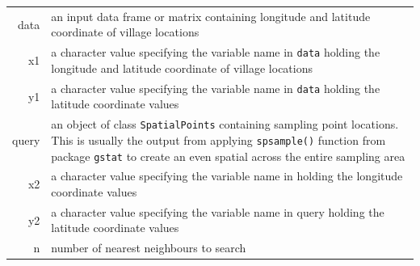 \documentclass[11pt,a4paper]{article}
\begin{document}
\begin{longtable}[]{@{}rl@{}}
\toprule
\begin{minipage}[t]{0.10\columnwidth}\raggedleft
data\strut
\end{minipage} & \begin{minipage}[t]{0.82\columnwidth}\raggedright
an input data frame or matrix containing longitude and latitude
coordinate of village locations\strut
\end{minipage}\tabularnewline
\begin{minipage}[t]{0.10\columnwidth}\raggedleft
x1\strut
\end{minipage} & \begin{minipage}[t]{0.82\columnwidth}\raggedright
a character value specifying the variable name in \texttt{data} holding
the longitude and latitude coordinate of village locations\strut
\end{minipage}\tabularnewline
\begin{minipage}[t]{0.10\columnwidth}\raggedleft
y1\strut
\end{minipage} & \begin{minipage}[t]{0.82\columnwidth}\raggedright
a character value specifying the variable name in \texttt{data} holding
the latitude coordinate values\strut
\end{minipage}\tabularnewline
\begin{minipage}[t]{0.10\columnwidth}\raggedleft
query\strut
\end{minipage} & \begin{minipage}[t]{0.82\columnwidth}\raggedright
an object of class \texttt{SpatialPoints} containing sampling point
locations. This is usually the output from applying \texttt{spsample()}
function from package \texttt{gstat} to create an even spatial across
the entire sampling area\strut
\end{minipage}\tabularnewline
\begin{minipage}[t]{0.10\columnwidth}\raggedleft
x2\strut
\end{minipage} & \begin{minipage}[t]{0.82\columnwidth}\raggedright
a character value specifying the variable name in holding the longitude
coordinate values\strut
\end{minipage}\tabularnewline
\begin{minipage}[t]{0.10\columnwidth}\raggedleft
y2\strut
\end{minipage} & \begin{minipage}[t]{0.82\columnwidth}\raggedright
a character value specifying the variable name in query holding the
latitude coordinate values\strut
\end{minipage}\tabularnewline
\begin{minipage}[t]{0.10\columnwidth}\raggedleft
n\strut
\end{minipage} & \begin{minipage}[t]{0.82\columnwidth}\raggedright
number of nearest neighbours to search\strut
\end{minipage}\tabularnewline
\bottomrule
\end{longtable}
\end{document}
